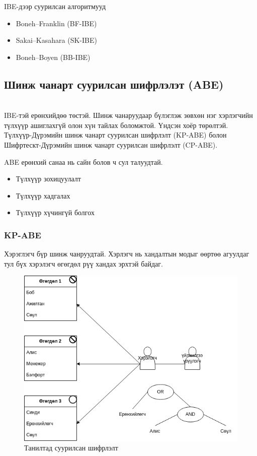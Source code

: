 IBE-дээр суурилсан алгоритмууд

\begin{itemize}
    \item Boneh–Franklin (BF-IBE)
    \item Sakai–Kasahara (SK-IBE)
    \item Boneh–Boyen (BB-IBE)
\end{itemize}

\subsection*{Шинж чанарт суурилсан шифрлэлэт (ABE)}\\
IBE-тэй ерөнхийдөө төстэй. Шинж чанаруудаар бүлэглэж зөвхөн нэг хэрлэгчийн түлхүүр ашиглахгүй олон хүн тайлах боломжтой.
Үндсэн хоёр төрөлтэй. Түлхүүр-Дүрэмийн шинж чанарт суурилсан шифрлэлт (KP-ABE) болон Шифртескт-Дүрэмийн шинж чанарт суурилсан шифрлэлт (CP-ABE).

ABE ерөнхий санаа нь сайн болов ч сул талуудтай.
\begin{itemize}
    \item Түлхүүр зохицуулалт
    \item Түлхүүр хадгалах
    \item Түлхүүр хүчингүй болгох
\end{itemize}

\subsubsection*{KP-ABE}
Хэрэглэгч бүр шинж чанруудтай. Хэрлэгч нь хандалтын модыг өөртөө агуулдаг тул бүх хэрэлэгч өгөгдөл рүү хандах эрхтэй байдаг.
\begin{figure}[ht]
    \centering
    \includegraphics[scale=0.6]{Figures/kp-abe.drawio.png}
    \caption[IBE]{Танилтад суурилсан шифрлэлт}
\label{fig:kp-abe}
\end{figure}

